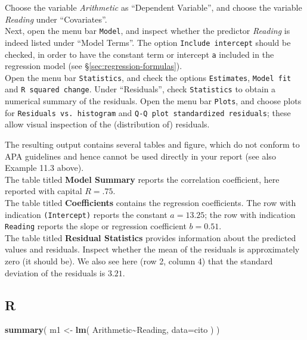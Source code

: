 \documentclass[
]{book}
\newenvironment{Shaded}{\begin{snugshade}}{\end{snugshade}}
\newcommand{\AttributeTok}[1]{\textcolor[rgb]{0.13,0.29,0.53}{#1}}
\newcommand{\FunctionTok}[1]{\textcolor[rgb]{0.13,0.29,0.53}{\textbf{#1}}}
\newcommand{\NormalTok}[1]{#1}
\newcommand{\OtherTok}[1]{\textcolor[rgb]{0.56,0.35,0.01}{#1}}
\newcommand{\SpecialCharTok}[1]{\textcolor[rgb]{0.81,0.36,0.00}{\textbf{#1}}}
\begin{document}
Choose the variable \emph{Arithmetic} as ``Dependent Variable'', and choose the variable \emph{Reading} under ``Covariates''.\\
Next, open the menu bar \texttt{Model}, and inspect whether the predictor \emph{Reading} is indeed listed under ``Model Terms''. The option \texttt{Include\ intercept} should be checked, in order to have the constant term or intercept \texttt{a} included in the regression model (see §\ref{sec:regression-formulas}).\\
Open the menu bar \texttt{Statistics}, and check the options \texttt{Estimates}, \texttt{Model\ fit} and \texttt{R\ squared\ change}.
Under ``Residuals'', check \texttt{Statistics} to obtain a numerical summary of the residuals.
Open the menu bar \texttt{Plots}, and choose plots for \texttt{Residuals\ vs.\ histogram} and \texttt{Q-Q\ plot\ standardized\ residuals}; these allow visual inspection of the (distribution of) residuals.

The resulting output contains several tables and figure, which do not conform to APA guidelines and hence cannot be used directly in your report (see also Example 11.3 above).\\
The table titled \textbf{Model Summary} reports the correlation coefficient, here reported with capital \(R=.75\).\\
The table titled \textbf{Coefficients} contains the regression coefficients. The row with indication \texttt{(Intercept)} reports the constant \(a=13.25\); the row with indication \texttt{Reading} reports the slope or regression coefficient \(b=0.51\).\\
The table titled \textbf{Residual Statistics} provides information about the predicted values and residuals. Inspect whether the mean of the residuals is approximately zero (it should be). We also see here (row 2, column 4) that the standard deviation of the residuals is \(3.21\).

\subsection{R}\label{r-8}

\begin{Shaded}
\begin{Highlighting}[]
\FunctionTok{summary}\NormalTok{( m1 }\OtherTok{\textless{}{-}} \FunctionTok{lm}\NormalTok{( Arithmetic}\SpecialCharTok{\textasciitilde{}}\NormalTok{Reading, }\AttributeTok{data=}\NormalTok{cito ) )}
\end{Highlighting}
\end{Shaded}
\end{document}
